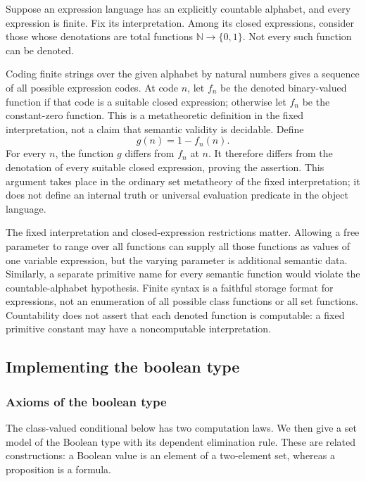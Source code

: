 \begin{proposition}
\label{thm:finite_syntax_limit}
Suppose an expression language has an explicitly countable alphabet,
and every expression is finite. Fix its interpretation. Among its closed
expressions, consider those whose denotations are total functions
$\mathbb N\to\{0,1\}$. Not every such function can be denoted.
\end{proposition}
\Proof
Coding finite strings over the given alphabet by natural numbers gives
a sequence of all possible expression codes. At code $n$, let $f_n$
be the denoted binary-valued function if that code is a suitable closed
expression; otherwise let $f_n$ be the constant-zero function. This is
a metatheoretic definition in the fixed interpretation, not a claim
that semantic validity is decidable. Define
\[
g(n)=1-f_n(n).
\]
For every $n$, the function $g$ differs from $f_n$ at $n$. It therefore
differs from the denotation of every suitable closed expression, proving
the assertion. This argument takes place in the ordinary set metatheory
of the fixed interpretation; it does not define an internal truth or
universal evaluation predicate in the object language.
\Done

The fixed interpretation and closed-expression restrictions matter.
Allowing a free parameter to range over all functions can supply all
those functions as values of one variable expression, but the varying
parameter is additional semantic data. Similarly, a separate primitive
name for every semantic function would violate the countable-alphabet
hypothesis. Finite syntax is a faithful storage format for expressions,
not an enumeration of all possible class functions or all set functions.
Countability does not assert that each denoted function is computable:
a fixed primitive constant may have a noncomputable interpretation.

\pagebreak
\subsection{Implementing the boolean type}

\subsubsection{Axioms of the boolean type}
The class-valued conditional below has two computation laws. We then
give a set model of the Boolean type with its dependent elimination rule.
These are related constructions: a Boolean value is an element of a
two-element set, whereas a proposition is a formula.

